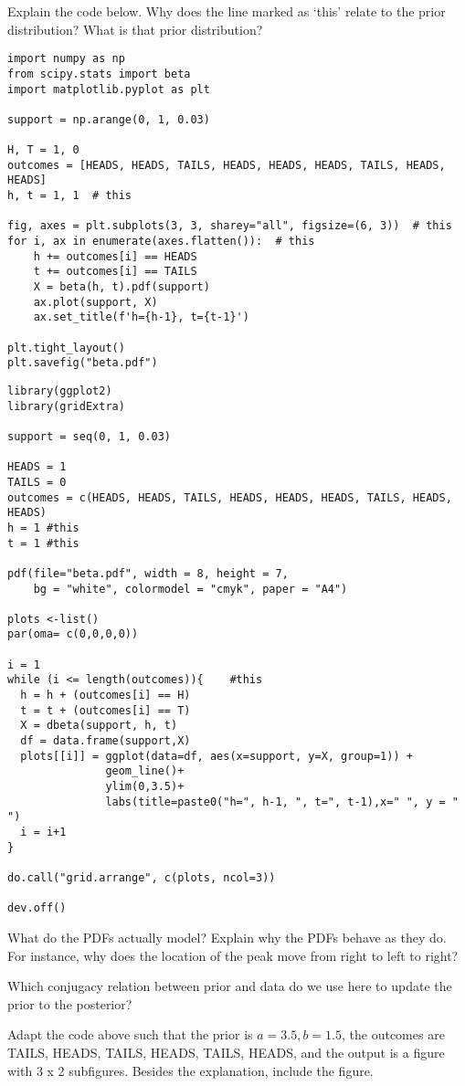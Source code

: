 \begin{exercise}
Explain the code below. Why does the line marked as `this' relate to the  prior distribution? What is that prior distribution?
\begin{verbatim}
import numpy as np
from scipy.stats import beta
import matplotlib.pyplot as plt

support = np.arange(0, 1, 0.03)

H, T = 1, 0
outcomes = [HEADS, HEADS, TAILS, HEADS, HEADS, HEADS, TAILS, HEADS, HEADS]
h, t = 1, 1  # this

fig, axes = plt.subplots(3, 3, sharey="all", figsize=(6, 3))  # this
for i, ax in enumerate(axes.flatten()):  # this
    h += outcomes[i] == HEADS
    t += outcomes[i] == TAILS
    X = beta(h, t).pdf(support)
    ax.plot(support, X)
    ax.set_title(f'h={h-1}, t={t-1}')

plt.tight_layout()
plt.savefig("beta.pdf")
\end{verbatim}

\begin{verbatim}
library(ggplot2)
library(gridExtra)

support = seq(0, 1, 0.03)

HEADS = 1
TAILS = 0
outcomes = c(HEADS, HEADS, TAILS, HEADS, HEADS, HEADS, TAILS, HEADS, HEADS)
h = 1 #this
t = 1 #this

pdf(file="beta.pdf", width = 8, height = 7,
    bg = "white", colormodel = "cmyk", paper = "A4")

plots <-list()
par(oma= c(0,0,0,0))

i = 1
while (i <= length(outcomes)){    #this
  h = h + (outcomes[i] == H)
  t = t + (outcomes[i] == T)
  X = dbeta(support, h, t)
  df = data.frame(support,X)
  plots[[i]] = ggplot(data=df, aes(x=support, y=X, group=1)) +
               geom_line()+
               ylim(0,3.5)+
               labs(title=paste0("h=", h-1, ", t=", t-1),x=" ", y = " ")
  i = i+1
}

do.call("grid.arrange", c(plots, ncol=3))

dev.off()
\end{verbatim}


\end{exercise}

\begin{exercise}
What do the PDFs actually model? Explain why the PDFs behave as they do. For instance, why does the location of the peak move from right to left to right?
\end{exercise}

\begin{exercise}
Which conjugacy relation between prior and data do we use here to update the prior to the posterior?
\end{exercise}

\begin{exercise}
Adapt the  code above such that the prior is $a=3.5, b= 1.5$, the outcomes are TAILS, HEADS, TAILS, HEADS, TAILS, HEADS, and the output is a figure with 3 x 2 subfigures. Besides the explanation, include the figure.
\end{exercise}




